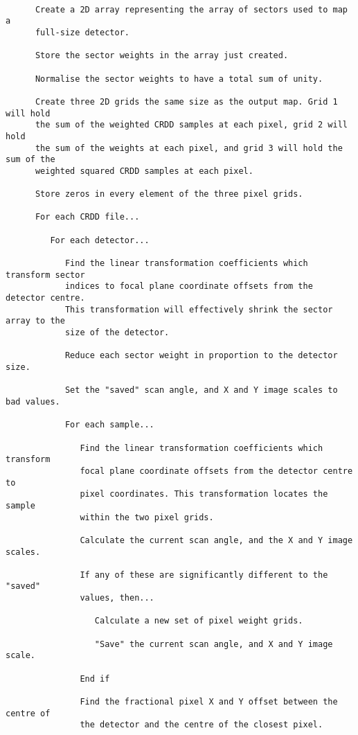 \begin{verbatim}

      Create a 2D array representing the array of sectors used to map a 
      full-size detector.

      Store the sector weights in the array just created.

      Normalise the sector weights to have a total sum of unity.

      Create three 2D grids the same size as the output map. Grid 1 will hold 
      the sum of the weighted CRDD samples at each pixel, grid 2 will hold 
      the sum of the weights at each pixel, and grid 3 will hold the sum of the 
      weighted squared CRDD samples at each pixel.

      Store zeros in every element of the three pixel grids.

      For each CRDD file...

         For each detector...

            Find the linear transformation coefficients which transform sector 
            indices to focal plane coordinate offsets from the detector centre. 
            This transformation will effectively shrink the sector array to the 
            size of the detector.

            Reduce each sector weight in proportion to the detector size.

            Set the "saved" scan angle, and X and Y image scales to bad values.

            For each sample...
      
               Find the linear transformation coefficients which transform 
               focal plane coordinate offsets from the detector centre to 
               pixel coordinates. This transformation locates the sample 
               within the two pixel grids.

               Calculate the current scan angle, and the X and Y image scales.

               If any of these are significantly different to the "saved" 
               values, then...
                  
                  Calculate a new set of pixel weight grids.

                  "Save" the current scan angle, and X and Y image scale.

               End if

               Find the fractional pixel X and Y offset between the centre of 
               the detector and the centre of the closest pixel.


\end{verbatim}

